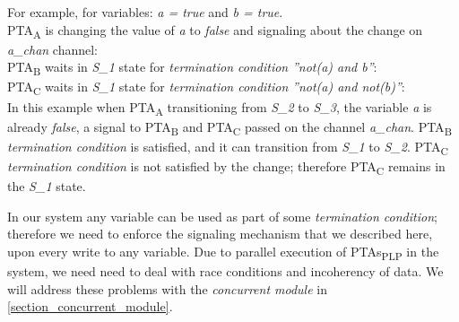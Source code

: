 \par For example, for variables: \textit{a = true} and \textit{b = true}. \\
PTA\textsubscript{A} is changing the value of \textit{a} to \textit{false} and signaling about the change on \textcolor{ColorUppaalChannel}{\textit{a_chan}} channel: \\
 PTA\textsubscript{B} waits in \textcolor{ColorUppaalState}{\textit{S_1}} state for \textit{termination condition} \textit{”not(a) and b”}: \\
 PTA\textsubscript{C} waits in \textcolor{ColorUppaalState}{\textit{S_1}} state for \textit{termination condition} \textit{”not(a) and not(b)”}:\\
 In this example when PTA\textsubscript{A} transitioning from \textcolor{ColorUppaalState}{\textit{S_2}} to \textcolor{ColorUppaalState}{\textit{S_3}}, the variable \textit{a} is already \textit{false}, a signal to PTA\textsubscript{B} and PTA\textsubscript{C} passed on the channel \textcolor{ColorUppaalChannel}{\textit{a_chan}}. PTA\textsubscript{B} \textit{termination condition} is satisfied, and it can transition from \textcolor{ColorUppaalState}{\textit{S_1}} to \textcolor{ColorUppaalState}{\textit{S_2}}. PTA\textsubscript{C} \textit{termination condition} is not satisfied by the change; therefore PTA\textsubscript{C} remains in the \textcolor{ColorUppaalState}{\textit{S_1}} state.
\par In our system any variable can be used as part of some \textit{termination condition}; therefore we need to enforce the signaling mechanism that we described here, upon every write to any variable. Due to parallel execution of PTAs\textsubscript{PLP} in the system, we need need to deal with race conditions and incoherency of data. We will address these problems with the \textit{concurrent module} in \ref{section_concurrent_module}. \\
